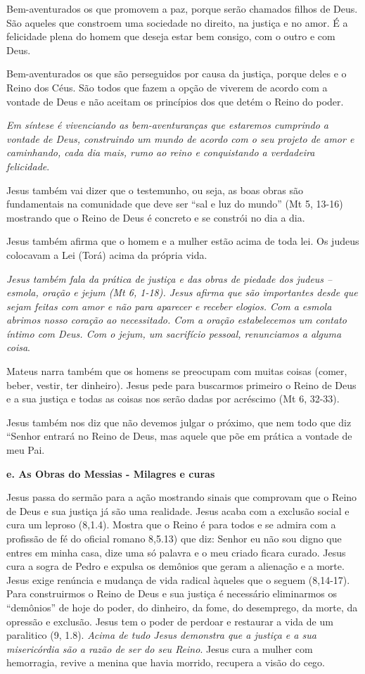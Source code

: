 \documentclass[
]{book}
\begin{document}
Bem-aventurados os que promovem a paz, porque serão chamados filhos de Deus. São aqueles que constroem uma sociedade no direito, na justiça e no amor. É a felicidade plena do homem que deseja estar bem consigo, com o outro e com Deus.

Bem-aventurados os que são perseguidos por causa da justiça, porque deles e o Reino dos Céus. São todos que fazem a opção de viverem de acordo com a vontade de Deus e não aceitam os princípios dos que detém o Reino do poder.

\emph{Em síntese é vivenciando as bem-aventuranças que estaremos cumprindo a vontade de Deus, construindo um mundo de acordo com o seu projeto de amor e caminhando, cada dia mais, rumo ao reino e conquistando a verdadeira felicidade}.

Jesus também vai dizer que o testemunho, ou seja, as boas obras são fundamentais na comunidade que deve ser ``sal e luz do mundo'' (Mt 5, 13-16) mostrando que o Reino de Deus é concreto e se constrói no dia a dia.

Jesus também afirma que o homem e a mulher estão acima de toda lei. Os judeus colocavam a Lei (Torá) acima da própria vida.

\emph{Jesus também fala da prática de justiça e das obras de piedade dos judeus -- esmola, oração e jejum (Mt 6, 1-18). Jesus afirma que são importantes desde que sejam feitas com amor e não para aparecer e receber elogios. Com a esmola abrimos nosso coração ao necessitado. Com a oração estabelecemos um contato íntimo com Deus. Com o jejum, um sacrifício pessoal, renunciamos a alguma coisa}.

Mateus narra também que os homens se preocupam com muitas coisas (comer, beber, vestir, ter dinheiro). Jesus pede para buscarmos primeiro o Reino de Deus e a sua justiça e todas as coisas nos serão dadas por acréscimo (Mt 6, 32-33).

Jesus também nos diz que não devemos julgar o próximo, que nem todo que diz ``Senhor entrará no Reino de Deus, mas aquele que põe em prática a vontade de meu Pai.

\textbf{e. As Obras do Messias - Milagres e curas}

Jesus passa do sermão para a ação mostrando sinais que comprovam que o Reino de Deus e sua justiça já são uma realidade. Jesus acaba com a exclusão social e cura um leproso (8,1.4). Mostra que o Reino é para todos e se admira com a profissão de fé do oficial romano 8,5.13) que diz: Senhor eu não sou digno que entres em minha casa, dize uma só palavra e o meu criado ficara curado. Jesus cura a sogra de Pedro e expulsa os demônios que geram a alienação e a morte. Jesus exige renúncia e mudança de vida radical àqueles que o seguem (8,14-17). Para construirmos o Reino de Deus e sua justiça é necessário eliminarmos os ``demônios'' de hoje do poder, do dinheiro, da fome, do desemprego, da morte, da opressão e exclusão. Jesus tem o poder de perdoar e restaurar a vida de um paralitico (9, 1.8). \emph{Acima de tudo Jesus demonstra que a justiça e a sua misericórdia são a razão de ser do seu Reino}. Jesus cura a mulher com hemorragia, revive a menina que havia morrido, recupera a visão do cego.
\end{document}
